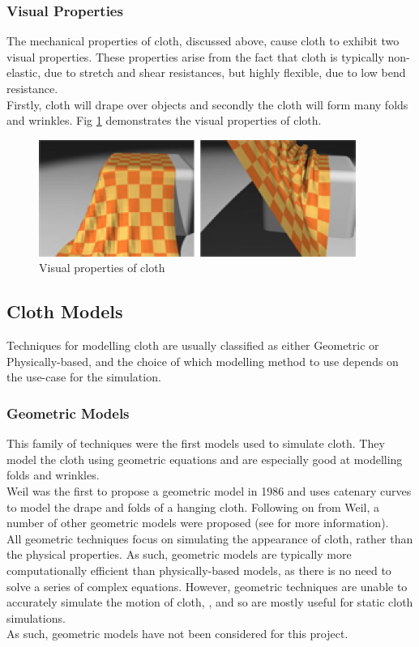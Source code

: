 \subsubsection{Visual Properties}
The mechanical properties of cloth, discussed above, cause cloth to exhibit two visual properties. These properties arise from the fact that cloth is typically non-elastic, due to stretch and shear resistances, but highly flexible, due to low bend resistance.
\\Firstly, cloth will drape over objects and secondly the cloth will form many folds and wrinkles. Fig \ref{fig:visual properties} demonstrates the visual properties of cloth.
\begin{figure}[tp]
   \begin{center}
     \includegraphics{Figures/visual_properties}
   \end{center}
   \caption[Visual Properties of cloth]{Visual properties of cloth \parencite[1]{Yalcn}}
   \label{fig:visual properties}
\end{figure}

\subsection{Cloth Models}
Techniques for modelling cloth are usually classified as either Geometric or Physically-based, and the choice of which modelling method to use depends on the use-case for the simulation.

\subsubsection{Geometric Models}
This family of techniques were the first models used to simulate cloth. They model the cloth using geometric equations and are especially good at modelling folds and wrinkles.
\\Weil was the first to propose a geometric model in 1986 and uses catenary curves to model the drape and folds of a hanging cloth. Following on from Weil, a number of other geometric models were proposed (see \textcite{Ng1996} for more information).
\\All geometric techniques focus on simulating the appearance of cloth, rather than the physical properties. As such, geometric models are typically more computationally efficient than physically-based models, as there is no need to solve a series of complex equations. However, geometric techniques are unable to accurately simulate the motion of cloth, \parencites[1]{Mongus2012}[2]{Zhang2001}[1-2]{Xinrong2009}, and so are mostly useful for static cloth simulations.
\\As such, geometric models have not been considered for this project.

